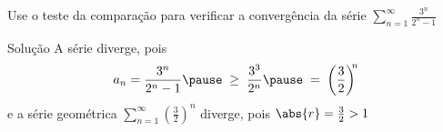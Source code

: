 \begin{question}
  Use o teste da comparação para verificar a convergência da série
  \(
    \sum_{n=1}^\infty\frac{3^n}{2^n-1}
  \)
\end{question}

\begin{resolution}{Solução}
  A série diverge\pause,
  pois
  \[
    a_n = \frac{3^n}{2^n-1}
    \pause
    \;\geq\; \frac{3^3}{2^n}
    \pause
    \;=\;    \left(\frac{3}{2}\right)^{\!\!{n}}
  \]
  \pause
  e a série geométrica
  \(
    \sum_{n=1}^\infty\left(\frac{3}{2}\right)^{\!\!{n}}
  \)
  diverge\pause, pois \quad
  \(
    \abs{r}=\frac{3}{2}>1
  \)
\end{resolution}


